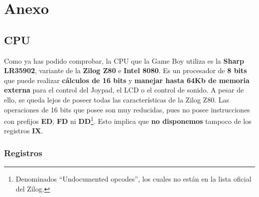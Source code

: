 \chapter{Anexo}
\label{anexo}

\section{CPU}

Como ya has podido comprobar, la CPU que la Game Boy utiliza es la \textbf{Sharp LR35902}, variante de la \textbf{Zilog Z80} e \textbf{Intel 8080}. Es un procesador de \textbf{8 bits} que puede realizar \textbf{cálculos de 16 bits} y \textbf{manejar hasta 64Kb de memoria externa} para el control del Joypad, el LCD o el control de sonido. A pesar de ello, se queda lejos de poseer todas las características de la Zilog Z80. Las operaciones de 16 bits que posee son muy reducidas, pues no posee instrucciones con prefijos \textbf{ED}, \textbf{FD} ni \textbf{DD}\footnote{Denominados ``Undocumented opcodes'', los cuales no están en la lista oficial del Zilog.}. Esto implica que \textbf{no disponemos} tampoco de los registros \textbf{IX}.

\subsection{Registros}

